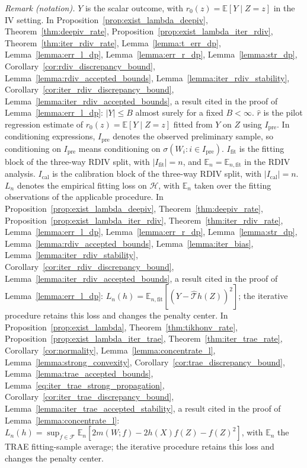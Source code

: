 \documentclass[12pt]{article}
\theoremstyle{plain}
\theoremstyle{definition}
\theoremstyle{remark}
\begin{document}
\noindent\textit{Remark (notation).} $Y$ is the scalar outcome, with $r_0(z)=\mathbb E[Y\mid Z=z]$ in the IV setting. In Proposition~\ref{prop:exist_lambda_deepiv}, Theorem~\ref{thm:deepiv_rate}, Proposition~\ref{prop:exist_lambda_iter_rdiv}, Theorem~\ref{thm:iter_rdiv_rate}, Lemma~\ref{lemma:t_err_dp}, Lemma~\ref{lemma:err_l_dp}, Lemma~\ref{lemma:err_r_dp}, Lemma~\ref{lemma:str_dp}, Corollary~\ref{cor:rdiv_discrepancy_bound}, Lemma~\ref{lemma:rdiv_accepted_bounds}, Lemma~\ref{lemma:iter_rdiv_stability}, Corollary~\ref{cor:iter_rdiv_discrepancy_bound}, Lemma~\ref{lemma:iter_rdiv_accepted_bounds}, a result cited in the proof of Lemma~\ref{lemma:err_l_dp}: $|Y|\leqslant B$ almost surely for a fixed $B<\infty$. $\hat r$ is the pilot regression estimate of $r_0(z)=\mathbb E[Y\mid Z=z]$ fitted from $Y$ on $Z$ using $I_{\mathrm{pre}}$. In conditioning expressions, $I_{\mathrm{pre}}$ denotes the observed preliminary sample, so conditioning on $I_{\mathrm{pre}}$ means conditioning on $\sigma(W_i:i\in I_{\mathrm{pre}})$. $I_{\mathrm{fit}}$ is the fitting block of the three-way RDIV split, with $|I_{\mathrm{fit}}|=n$, and $\mathbb E_n=\mathbb E_{n,\mathrm{fit}}$ in the RDIV analysis. $I_{\mathrm{cal}}$ is the calibration block of the three-way RDIV split, with $|I_{\mathrm{cal}}|=n$. $L_n$ denotes the empirical fitting loss on $\mathcal H$, with $\mathbb E_n$ taken over the fitting observations of the applicable procedure. In Proposition~\ref{prop:exist_lambda_deepiv}, Theorem~\ref{thm:deepiv_rate}, Proposition~\ref{prop:exist_lambda_iter_rdiv}, Theorem~\ref{thm:iter_rdiv_rate}, Lemma~\ref{lemma:err_l_dp}, Lemma~\ref{lemma:err_r_dp}, Lemma~\ref{lemma:str_dp}, Lemma~\ref{lemma:rdiv_accepted_bounds}, Lemma~\ref{lemma:iter_bias}, Lemma~\ref{lemma:iter_rdiv_stability}, Corollary~\ref{cor:iter_rdiv_discrepancy_bound}, Lemma~\ref{lemma:iter_rdiv_accepted_bounds}, a result cited in the proof of Lemma~\ref{lemma:err_l_dp}: $L_n(h)=\mathbb E_{n,\mathrm{fit}}[(Y-\hat{\mathcal T}h(Z))^2]$; the iterative procedure retains this loss and changes the penalty center. In Proposition~\ref{prop:exist_lambda}, Theorem~\ref{thm:tikhonv_rate}, Proposition~\ref{prop:exist_lambda_iter_trae}, Theorem~\ref{thm:iter_trae_rate}, Corollary~\ref{cor:normality}, Lemma~\ref{lemma:concentrate_l}, Lemma~\ref{lemma:strong_convexity}, Corollary~\ref{cor:trae_discrepancy_bound}, Lemma~\ref{lemma:trae_accepted_bounds}, Lemma~\ref{eq:iter_trae_strong_propagation}, Corollary~\ref{cor:iter_trae_discrepancy_bound}, Lemma~\ref{lemma:iter_trae_accepted_stability}, a result cited in the proof of Lemma~\ref{lemma:concentrate_l}: $L_n(h)=\sup_{f\in\mathcal F}\mathbb E_n[2m(W;f)-2h(X)f(Z)-f(Z)^2]$, with $\mathbb E_n$ the TRAE fitting-sample average; the iterative procedure retains this loss and changes the penalty center.
\end{document}
